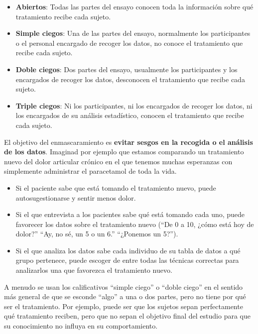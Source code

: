 \documentclass[
]{book}
\theoremstyle{definition}
\theoremstyle{definition}
\theoremstyle{definition}
\theoremstyle{definition}
\theoremstyle{remark}
\begin{document}
\begin{itemize}
\item
  \textbf{Abiertos}: Todas las partes del ensayo conocen toda la información sobre qué tratamiento recibe cada sujeto.
\item
  \textbf{Simple ciegos}: Una de las partes del ensayo, normalmente los participantes o el personal encargado de recoger los datos, no conoce el tratamiento que recibe cada sujeto.
\item
  \textbf{Doble ciegos}: Dos partes del ensayo, usualmente los participantes y los encargados de recoger los datos, desconocen el tratamiento que recibe cada sujeto.
\item
  \textbf{Triple ciegos}: Ni los participantes, ni los encargados de recoger los datos, ni los encargados de su análisis estadístico, conocen el tratamiento que recibe cada sujeto.
\end{itemize}

El objetivo del enmascaramiento es \textbf{evitar sesgos en la recogida o el análisis de los datos}. Imaginad por ejemplo que estamos comparando un tratamiento nuevo del dolor articular crónico en el que tenemos muchas esperanzas con simplemente administrar el paracetamol de toda la vida.

\begin{itemize}
\item
  Si el paciente sabe que está tomando el tratamiento nuevo, puede autosugestionarse y sentir menos dolor.
\item
  Si el que entrevista a los pacientes sabe qué está tomando cada uno, puede favorecer los datos sobre el tratamiento nuevo (``De 0 a 10, ¿cómo está hoy de dolor?'' ``Ay, no sé, un 5 o un 6.'' ``¿Ponemos un 5?'').
\item
  Si el que analiza los datos sabe cada individuo de su tabla de datos a qué grupo pertenece, puede escoger de entre todas las técnicas correctas para analizarlos una que favorezca el tratamiento nuevo.
\end{itemize}

\begin{rmdnote}
A menudo se usan los calificativos ``simple ciego'' o ``doble ciego'' en el sentido más general de que se esconde ``algo'' a una o dos partes, pero no tiene por qué ser el tratamiento. Por ejemplo, puede ser que los sujetos sepan perfectamente qué tratamiento reciben, pero que no sepan el objetivo final del estudio para que su conocimiento no influya en su comportamiento.
\end{rmdnote}
\end{document}
